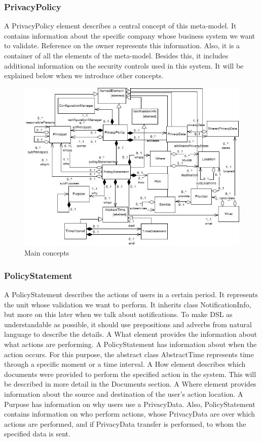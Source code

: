 \documentclass[11pt,english]{article}
\begin{document}
\subsubsection{PrivacyPolicy}
A PrivacyPolicy element describes a central concept of this meta-model. It contains information about the specific company whose business system we want to validate. Reference on the owner represents this information. Also, it is a container of all the elements of the meta-model. Besides this, it includes additional information on the security controls used in this system. It will be explained below when we introduce other concepts.
\begin{figure}[H]
    \centering
    \includegraphics[width=12.5cm]{images/mainconcepts.jpg}
    \caption{Main concepts}
    \label{fig:mainconcepts}
\end{figure}
\subsubsection{PolicyStatement}
A PolicyStatement describes the actions of users in a certain period. It represents the unit whose validation we want to perform. It inherits class NotificationInfo, but more on this later when we talk about notifications. To make DSL as understandable as possible, it should use prepositions and adverbs from natural language to describe the details. A What element provides the information about what actions are performing. A PolicyStatement has information about when the action occurs. For this purpose, the abstract class AbstractTime represents time through a specific moment or a time interval. A How element describes which documents were provided to perform the specified action in the system. This will be described in more detail in the Documents section. A Where element provides information about the source and destination of the user's action location. A Purpose has information on why users use a PrivacyData. Also, PolicyStatement contains information on who perform actions, whose PrivacyData are over which actions are performed, and if PrivacyData transfer is performed, to whom the specified data is sent.
\end{document}
